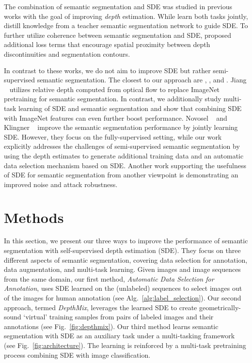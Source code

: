 \documentclass[final]{cvpr}
\begin{document}
The combination of semantic segmentation and SDE was studied in previous works with the goal of improving \textit{depth} estimation. 
While \cite{ramirez2018geometry, jiao2018look, chen2019towards, klingner2020self} learn both tasks jointly, \cite{casser2019depth, guizilini2020semantically, jiang2019sense} distill knowledge from a teacher semantic segmentation network to guide SDE. 
To further utilize coherence between semantic segmentation and SDE, \cite{ramirez2018geometry, chen2019towards} proposed additional loss terms that encourage spatial proximity between depth discontinuities and segmentation contours. 

In contrast to these works, we do not aim to improve SDE but rather semi-supervised semantic segmentation. 
The closest to our approach are \cite{jiang2018self}, \cite{novoselboosting}, and \cite{klingner2020self}. 
Jiang \etal~\cite{jiang2018self} utilizes relative depth computed from optical flow to replace ImageNet pretraining for semantic segmentation.
In contrast, we additionally study multi-task learning of SDE and semantic segmentation and show that combining SDE with ImageNet features can even further boost performance.
Novosel \etal~\cite{novoselboosting} and Klingner \etal~\cite{klingner2020self} improve the semantic segmentation performance by jointly learning SDE. However, they focus on the fully-supervised setting, while our work explicitly addresses the challenges of semi-supervised semantic segmentation by using the depth estimates to generate additional training data and an automatic data selection mechanism based on SDE.
Another work supporting the usefulness of SDE for semantic segmentation from another viewpoint is \cite{klingner2020improved} demonstrating an improved noise and attack robustness.

 \section{Methods}
\label{sec:methods}

In this section, we present our three ways to improve the performance of semantic segmentation with self-supervised depth estimation (SDE). They focus on three different aspects of semantic segmentation, covering data selection for annotation, data augmentation, and multi-task learning. Given  images and  image sequences from the same domain, our first method, \emph{Automatic Data Selection for Annotation}, uses SDE learned on the  (unlabeled) sequences to select  images out of the  images for human annotation (see Alg.~\ref{alg:label_selection}). Our second approach, termed \emph{DepthMix}, leverages the learned SDE to create geometrically-sound `virtual' training samples from pairs of labeled images and their annotations (see Fig.~\ref{fig:depthmix}). Our third method learns semantic segmentation with SDE as an auxiliary task under a multi-tasking framework (see Fig.~\ref{fig:architecture}). The learning is reinforced by a multi-task pretraining process combining SDE with image classification. 
\end{document}

